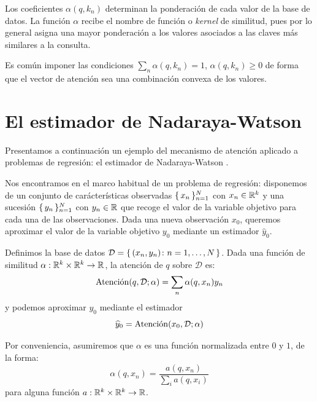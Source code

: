 Los coeficientes \( \alpha(q, k_n) \) determinan la ponderación de cada valor de la base de datos. La función \( \alpha \) recibe el nombre de función o \textit{kernel} de similitud, pues por lo general asigna una mayor ponderación a los valores asociados a las claves más similares a la consulta.

Es común imponer las condiciones \( \sum_n \alpha(q, k_n) = 1 \), \( \alpha(q, k_n) \geq 0\) de forma que el vector de atención sea una combinación convexa de los valores.

\section{El estimador de Nadaraya-Watson}
Presentamos a continuación un ejemplo del mecanismo de atención aplicado a problemas de regresión: el estimador de Nadaraya-Watson \cite{watson1964smooth,nadaraya1964estimating}.

Nos encontramos en el marco habitual de un problema de regresión: disponemos de un conjunto de carácterísticas observadas \( \{\,x_{n}\,\}_{n = 1}^N \) con \( x_{n}  \in \mathbb{R}^{k} \) y una sucesión \( \{\,y_n\,\}_{n = 1}^N \) con \( y_n \in \mathbb{R} \) que recoge el valor de la variable objetivo para cada una de las observaciones. Dada una nueva observación \( x_{0} \), queremos aproximar el valor de la variable objetivo \( y_{0} \) mediante un estimador \( \widehat{y}_{0} \).

Definimos la base de datos \( \mathcal{D} = \{\, (x_{n}, y_{n}) \colon n = 1, \dots, N \,\} \). Dada una función de similitud  \( \alpha : \mathbb{R}^{k} \times \mathbb{R}^{k} \to \mathbb{R} \), la atención de \( q \) sobre \( \mathcal{D} \) es:
\[
    \operatorname{Atenci\acute{o}n}(q, \mathcal{D}; \alpha) = \sum_n \alpha(q, x_{n}) y_{n}
\]
y podemos aproximar \( y_{0} \) mediante el estimador
\begin{equation}\label{eq:kde}
    \widehat{y}_{0} = \operatorname{Atenci\acute{o}n}(x_{0}, \mathcal{D}; \alpha) 
\end{equation}

Por conveniencia, asumiremos que \( \alpha \) es una función normalizada entre \( 0 \) y \( 1 \), de la forma:
\[
    \alpha(q, x_n) = \frac{a(q, x_n)}{\sum_i a(q, x_{i}) }
\]
para alguna función \( a : \mathbb{R}^{k} \times \mathbb{R}^{k} \to \mathbb{R} \).

